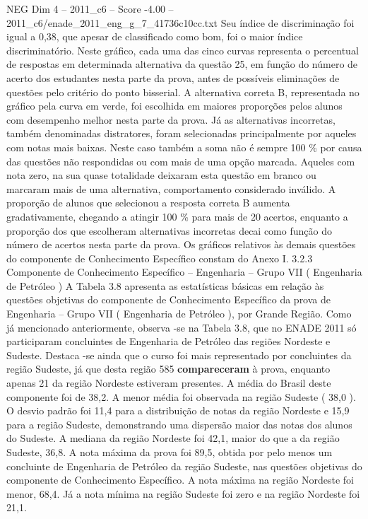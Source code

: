 \begin{textsample}{NEG Dim 4 – 2011\_c6 – Score -4.00 – 2011\_c6/enade\_2011\_eng\_g\_7\_41736c10cc.txt}
Seu índice de discriminação foi igual a 0,38, que apesar de classificado como bom, foi o maior índice discriminatório.
Neste gráfico, cada uma das cinco curvas representa o percentual de respostas em determinada alternativa da questão 25, em função do número de acerto dos estudantes nesta parte da prova, antes de possíveis eliminações de questões pelo critério do ponto bisserial.
A alternativa correta B, representada no gráfico pela curva em verde, foi escolhida em maiores proporções pelos alunos com desempenho melhor nesta parte da prova.
Já as alternativas incorretas, também denominadas distratores, foram selecionadas principalmente por aqueles com notas mais baixas.
Neste caso também a soma não é sempre 100 \% por causa das questões não respondidas ou com mais de uma opção marcada.
Aqueles com nota zero, na sua quase totalidade deixaram esta questão em branco ou marcaram mais de uma alternativa, comportamento considerado inválido.
A proporção de alunos que selecionou a resposta correta B aumenta gradativamente, chegando a atingir 100 \% para mais de 20 acertos, enquanto a proporção dos que escolheram alternativas incorretas decai como função do número de acertos nesta parte da prova.
Os gráficos relativos às demais questões do componente de Conhecimento Específico constam do Anexo I. 3.2.3 Componente de Conhecimento Específico – Engenharia – Grupo VII ( Engenharia de Petróleo ) A Tabela 3.8 apresenta as estatísticas básicas em relação às questões objetivas do componente de Conhecimento Específico da prova de Engenharia – Grupo VII ( Engenharia de Petróleo ), por Grande Região.
Como já mencionado anteriormente, observa -se na Tabela 3.8, que no ENADE 2011 só participaram concluintes de Engenharia de Petróleo das regiões Nordeste e Sudeste.
Destaca -se ainda que o curso foi mais representado por concluintes da região Sudeste, já que desta região 585 \textbf{compareceram} à prova, enquanto apenas 21 da região Nordeste estiveram presentes.
A média do Brasil deste componente foi de 38,2.
A menor média foi observada na região Sudeste ( 38,0 ).
O desvio padrão foi 11,4 para a distribuição de notas da região Nordeste e 15,9 para a região Sudeste, demonstrando uma dispersão maior das notas dos alunos do Sudeste.
A mediana da região Nordeste foi 42,1, maior do que a da região Sudeste, 36,8.
A nota máxima da prova foi 89,5, obtida por pelo menos um concluinte de Engenharia de Petróleo da região Sudeste, nas questões objetivas do componente de Conhecimento Específico.
A nota máxima na região Nordeste foi menor, 68,4.
Já a nota mínima na região Sudeste foi zero e na região Nordeste foi 21,1.

\end{textsample}
